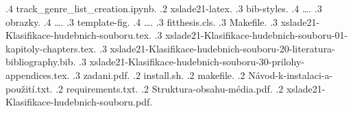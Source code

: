 {    .4 track\_genre\_list\_creation.ipynb.
    .2 xslade21-latex.
    .3 bib-styles.
    .4 \dots.
    .3 obrazky.
    .4 \dots.
    .3 template-fig.
    .4 \dots.
    .3 fitthesis.cls.
    .3 Makefile.
    .3 xslade21-Klasifikace-hudebnich-souboru.tex.
    .3 xslade21-Klasifikace-hudebnich-souboru-01-kapitoly-chapters.tex.
    .3 xslade21-Klasifikace-hudebnich-souboru-20-literatura-bibliography.bib.
    .3 xslade21-Klasifikace-hudebnich-souboru-30-prilohy-appendices.tex.
    .3 zadani.pdf.
    .2 install.sh.
    .2 makefile.
    .2 Návod-k-instalaci-a-použití.txt.
    .2 requirements.txt.
    .2 Struktura-obsahu-média.pdf.
    .2 xslade21-Klasifikace-hudebnich-souboru.pdf.
}